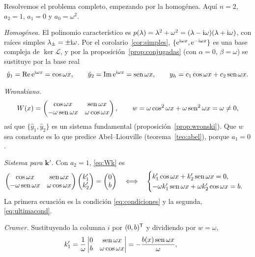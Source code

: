 \documentclass[11pt,twoside]{article}
\newcommand\Lop{\mathcal L}
\newcommand\yh{\hat y}
\newcommand\vk{\bm k}
\newcommand\mat[1]{\begin{pmatrix}#1\end{pmatrix}}
\begin{document}
\begin{ejemplo}[Oscilador forzado, $y''+\omega^2y=b(x)$, con $\omega>0$]\label{ej:forzado}
Resolvemos el problema completo, empezando por la homogénea. Aquí $n=2$, $a_2=1$, $a_1=0$ y $a_0=\omega^2$.
\begin{pasos}
\item \emph{Homogénea.} El polinomio característico es $p(\lambda)=\lambda^2+\omega^2=(\lambda-\mathrm{i}\omega)(\lambda+\mathrm{i}\omega)$,
con raíces simples $\lambda_\pm=\pm\mathrm{i}\omega$. Por el corolario~\ref{cor:simples}, $\{\mathrm{e}^{\mathrm{i}\omega x},\mathrm{e}^{-\mathrm{i}\omega x}\}$ es
una base compleja de $\ker\Lop$, y por la proposición~\ref{prop:conjugadas} (con $\alpha=0$, $\beta=\omega$) se sustituye por
la base real
\begin{equation*}
\yh_1=\Re\e^{\iu\omega x}=\cos\omega x,\qquad\yh_2=\Im\e^{\iu\omega x}=\sen\omega x,\qquad y_h=c_1\cos\omega x+c_2\sen\omega x.
\end{equation*}
\item \emph{Wronskiano.}
\begin{equation*}
W(x)=\mat{\cos\omega x&\sen\omega x\\-\omega\sen\omega x&\omega\cos\omega x},\qquad
w=\omega\cos^2\omega x+\omega\sen^2\omega x=\omega\neq0,
\end{equation*}
así que $\{\yh_1,\yh_2\}$ es un sistema fundamental (proposición~\ref{prop:wronski}). Que $w$ sea constante es lo que
predice Abel--Liouville (teorema~\ref{teo:abel}), porque $a_1=0$.
\item \emph{Sistema para $\vk'$.} Con $a_2=1$, \eqref{eq:Wk} es
\begin{equation*}
\mat{\cos\omega x&\sen\omega x\\-\omega\sen\omega x&\omega\cos\omega x}\mat{k_1'\\k_2'}=\mat{0\\b}
\quad\Longleftrightarrow\quad
\begin{cases}k_1'\cos\omega x+k_2'\sen\omega x=0,\\ -\omega k_1'\sen\omega x+\omega k_2'\cos\omega x=b.\end{cases}
\end{equation*}
La primera ecuación es la condición \eqref{eq:condiciones} y la segunda, \eqref{eq:ultimacond}.
\item \emph{Cramer.} Sustituyendo la columna $i$ por $(0,b)^{\mathsf T}$ y dividiendo por $w=\omega$,
\begin{equation*}
k_1'=\frac1\omega\begin{vmatrix}0&\sen\omega x\\b&\omega\cos\omega x\end{vmatrix}=-\frac{b(x)\sen\omega x}{\omega},\qquad

\end{equation*}
\end{pasos}
\end{ejemplo}
\end{document}
